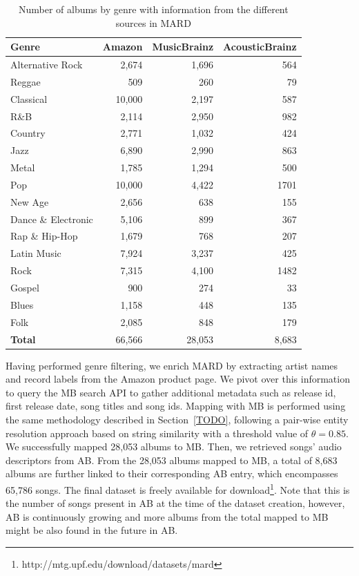 \begin{table}[h]
\scriptsize
\centering
\begin{tabular}{|l|r|r|r|}
\hline
\textbf{Genre} & \textbf{Amazon} & \textbf{MusicBrainz} & \textbf{AcousticBrainz} \\
\hline
Alternative Rock & 2,674 & 1,696 & 564 \\
Reggae & 509 & 260 & 79 \\
Classical & 10,000 & 2,197 & 587 \\
R\&B & 2,114 & 2,950 & 982 \\
Country & 2,771 & 1,032 & 424 \\
Jazz & 6,890 & 2,990 & 863 \\
Metal & 1,785 & 1,294 & 500 \\
Pop & 10,000 & 4,422 & 1701 \\
New Age & 2,656 & 638 & 155 \\
Dance \& Electronic & 5,106 & 899 & 367 \\
Rap \& Hip-Hop & 1,679 & 768 & 207 \\
Latin Music & 7,924 & 3,237 & 425 \\
Rock & 7,315 & 4,100 & 1482 \\
Gospel & 900 & 274 & 33 \\
Blues & 1,158 & 448 & 135 \\
Folk & 2,085 & 848 & 179 \\
\hline
\textbf{Total} & 66,566 & 28,053 & 8,683 \\
\hline
\end{tabular}
\caption{Number of albums by genre with information from the different sources in MARD}
\label{tbl:dataset}
\end{table}

Having performed genre filtering, we enrich MARD by extracting artist names and record labels from the Amazon product page. We pivot over this information to query the MB search API to gather additional metadata such as release id, first release date, song titles and song ids. Mapping with MB is performed using the same methodology described in Section~\ref{TODO}, following a pair-wise entity resolution approach based on string similarity with a threshold value of $\theta=0.85$. We successfully mapped 28,053 albums to MB. Then, we retrieved songs' audio descriptors from AB. From the 28,053 albums mapped to MB, a total of 8,683 albums are further linked to their corresponding AB entry, which encompasses 65,786 songs. The final dataset is freely available for download\footnote{http://mtg.upf.edu/download/datasets/mard}.
Note that this is the number of songs present in AB at the time of the dataset creation, however, AB is continuously growing and more albums from the total mapped to MB might be also found in the future in AB. %

